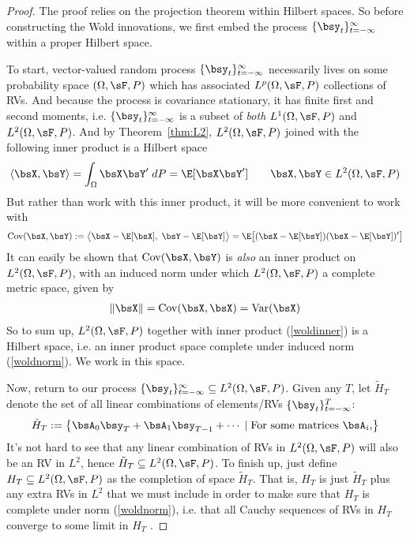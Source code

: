 \documentclass[12pt]{article}
\theoremstyle{plain}
\theoremstyle{definition}
\theoremstyle{remark}
\newcommand{\Cov}{\operatorname{Cov}}
\newcommand{\Var}{\operatorname{Var}}
\newcommand{\tinfinf}{_{t=-\infty}^\infty}
\begin{document}
\clearpage
\begin{proof}
The proof relies on the projection theorem within Hilbert spaces.  So
before constructing the Wold innovations, we first embed the process
$\{\bsy_t\}\tinfinf$ within a proper Hilbert space.

To start, vector-valued random process $\{\bsy_t\}\tinfinf$ necessarily
lives on some probability space $(\Omega,\sF,P)$ which has associated
$L^p(\Omega,\sF,P)$ collections of RVs. And because the process is
covariance stationary, it has finite first and second moments, i.e.
$\{\bsy_t\}\tinfinf$ is a subset of \emph{both} $L^1(\Omega,\sF,P)$ and
$L^2(\Omega,\sF,P)$.
And by Theorem~\ref{thm:L2}, $L^2(\Omega,\sF,P)$ joined with the
following inner product is a Hilbert space
\begin{align*}
  \langle \bsX,\bsY\rangle
  = \int_\Omega \bsX \bsY' \;dP
  = \E[\bsX\bsY']
  \qquad
  \bsX,\bsY \in L^2(\Omega,\sF,P)
\end{align*}
But rather than work with this inner product, it will be more convenient
to work with
\begin{align}
  \Cov(\bsX,\bsY)
  := \big\langle \bsX-\E[\bsX],\;\bsY-\E[\bsY]\big\rangle
  = \E\big[(\bsX-\E[\bsY])(\bsX-\E[\bsY])'\big]
  \label{woldinner}
\end{align}
It can easily be shown that $\Cov(\bsX,\bsY)$ is \emph{also} an inner
product on $L^2(\Omega,\sF,P)$, with an induced norm under which
$L^2(\Omega,\sF,P)$ a complete metric space, given by
\begin{align}
  \lVert \bsX\rVert
  =
  \Cov(\bsX,\bsX)
  = \Var(\bsX)
  \label{woldnorm}
\end{align}
So to sum up, $L^2(\Omega,\sF,P)$ together with inner product
(\ref{woldinner}) is a Hilbert space, i.e. an inner product
space complete under induced norm (\ref{woldnorm}). We work in this
space.

Now, return to our process
$\{\bsy_t\}\tinfinf\subseteq L^2(\Omega,\sF,P)$.
Given any $T$, let $\tilde{H}_T$ denote the set of all linear
combinations of elements/RVs $\{\bsy_t\}_{t=-\infty}^T$:
\begin{align*}
  \tilde{H}_T :=
  \big\{ \bsA_0 \bsy_T + \bsA_1\bsy_{T-1} + \cdots
        \;|\; \text{For some matrices $\bsA_i$,}
  \big\}
\end{align*}
It's not hard to see that any linear combination of RVs in
$L^2(\Omega,\sF,P)$ will also be an RV in $L^2$, hence
$\tilde{H}_T\subseteq L^2(\Omega,\sF,P)$.
To finish up, just define $H_T\subseteq L^2(\Omega,\sF,P)$ as the
completion of space $\tilde{H}_T$. That is, $H_T$ is just $\tilde{H}_T$
plus any extra RVs in $L^2$ that we must include in order to make sure
that $H_T$ is complete under norm (\ref{woldnorm}), i.e. that all Cauchy
sequences of RVs in $H_T$ converge to some limit in $H_T$ .


\end{proof}
\end{document}
